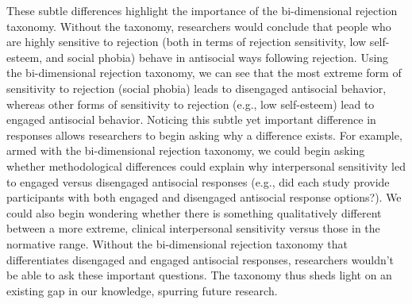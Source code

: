 \documentclass[
]{udthesis}
\begin{document}
These subtle differences highlight the importance of the bi-dimensional
rejection taxonomy. Without the taxonomy, researchers would conclude
that people who are highly sensitive to rejection (both in terms of
rejection sensitivity, low self-esteem, and social phobia) behave in
antisocial ways following rejection. Using the bi-dimensional rejection
taxonomy, we can see that the most extreme form of sensitivity to
rejection (social phobia) leads to disengaged antisocial behavior,
whereas other forms of sensitivity to rejection (e.g., low self-esteem)
lead to engaged antisocial behavior. Noticing this subtle yet important
difference in responses allows researchers to begin asking why a
difference exists. For example, armed with the bi-dimensional rejection
taxonomy, we could begin asking whether methodological differences could
explain why interpersonal sensitivity led to engaged versus disengaged
antisocial responses (e.g., did each study provide participants with
both engaged and disengaged antisocial response options?). We could also
begin wondering whether there is something qualitatively different
between a more extreme, clinical interpersonal sensitivity versus those
in the normative range. Without the bi-dimensional rejection taxonomy
that differentiates disengaged and engaged antisocial responses,
researchers wouldn't be able to ask these important questions. The
taxonomy thus sheds light on an existing gap in our knowledge, spurring
future research.
\end{document}
